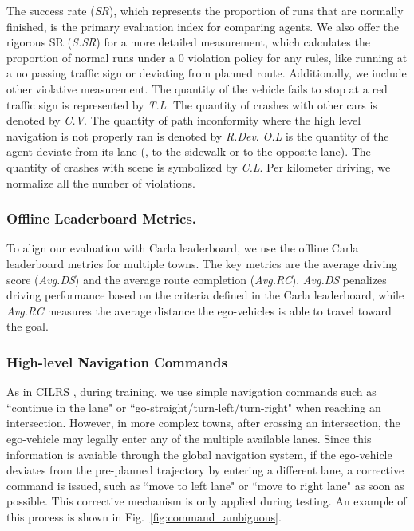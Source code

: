 The success rate (\emph{SR}), which represents the proportion of runs that are normally finished, is the primary evaluation index for comparing agents.
We also offer the rigorous SR (\emph{S.SR}) for a more detailed measurement, which calculates the proportion of normal runs under a 0 violation policy for any rules, like running at a no passing traffic sign or deviating from planned route.
Additionally, we include other violative measurement.
The quantity of the vehicle fails to stop at a red traffic sign is represented by \emph{T.L}.
The quantity of crashes with other cars is denoted by \emph{C.V}.
The quantity of path inconformity where the high level navigation is not properly ran is denoted by \emph{R.Dev}.
\emph{O.L} is the quantity of the agent deviate from its lane ({\eg}, to the sidewalk or to the opposite lane).
The quantity of crashes with scene is symbolized by \emph{C.L}.
Per kilometer driving, we normalize all the number of violations.


\subsubsection{Offline Leaderboard Metrics.}\label{lb_metrics}
\hspace{1pc}To align our evaluation with Carla leaderboard\cite{Hu:2022}, we use the offline Carla leaderboard metrics for multiple towns. 
The key metrics are the average driving score (\emph{Avg.DS}) and the average route completion (\emph{Avg.RC}). 
\emph{Avg.DS} penalizes driving performance based on the criteria defined in the Carla leaderboard, 
while \emph{Avg.RC} measures the average distance the ego-vehicles is able to travel toward the goal.


\subsubsection{High-level Navigation Commands} 
\hspace{1pc}As in CILRS \cite{Codevilla:2019}, during training, we use simple navigation commands such as ``continue in the lane" or ``go-straight/turn-left/turn-right" when reaching an intersection.
However, in more complex towns, after crossing an intersection, the ego-vehicle may legally enter any of the multiple available lanes. 
Since this information is avaiable through the global navigation system, if the ego-vehicle deviates from the pre-planned trajectory by entering a different lane, a corrective command is issued, such as ``move to left lane" or ``move to right lane" as soon as possible. 
This corrective mechanism is only applied during testing. 
An example of this process is shown in Fig.~\ref{fig:command_ambiguous}.



